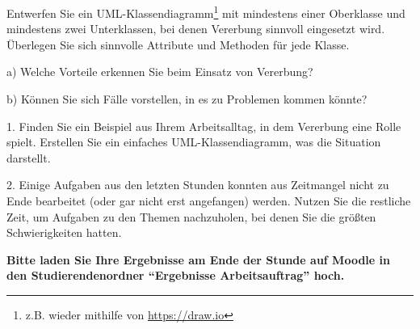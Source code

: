 \documentclass[11pt, a4paper, oneside]{article}
\begin{document}
	Entwerfen Sie ein UML-Klassendiagramm\footnote{z.B. wieder mithilfe von \url{https://draw.io}} mit mindestens einer Oberklasse und mindestens zwei Unterklassen, bei denen Vererbung sinnvoll eingesetzt wird.
	Überlegen Sie sich sinnvolle Attribute und Methoden für jede Klasse.
	
	\boxarea[7cm]
	
	
	a) Welche Vorteile erkennen Sie beim Einsatz von Vererbung?
	
	\lines[3cm]
	
	b) Können Sie sich Fälle vorstellen, in es zu Problemen kommen könnte?
	
	\lines[3cm]
	
	
	1. Finden Sie ein Beispiel aus Ihrem Arbeitsalltag, in dem Vererbung eine Rolle spielt.
	Erstellen Sie ein einfaches UML-Klassendiagramm, was die Situation darstellt.
	
	\boxarea[10cm]
	
	2. Einige Aufgaben aus den letzten Stunden konnten aus Zeitmangel nicht zu Ende bearbeitet (oder gar nicht erst angefangen) werden.
	Nutzen Sie die restliche Zeit, um Aufgaben zu den Themen nachzuholen, bei denen Sie die größten Schwierigkeiten hatten.
	
	\textbf{Bitte laden Sie Ihre Ergebnisse am Ende der Stunde auf Moodle in den Studierendenordner ``Ergebnisse Arbeitsauftrag'' hoch.}
	
\end{document}
